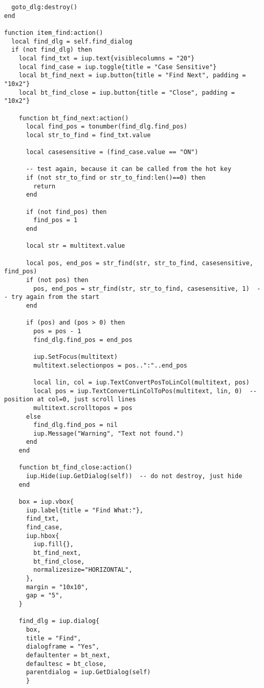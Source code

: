 \documentclass{ctexart}
\begin{document}
\begin{lstlisting}
  goto_dlg:destroy()
end

function item_find:action()
  local find_dlg = self.find_dialog
  if (not find_dlg) then
    local find_txt = iup.text{visiblecolumns = "20"}
    local find_case = iup.toggle{title = "Case Sensitive"}
    local bt_find_next = iup.button{title = "Find Next", padding = "10x2"}
    local bt_find_close = iup.button{title = "Close", padding = "10x2"}

    function bt_find_next:action()
      local find_pos = tonumber(find_dlg.find_pos)
      local str_to_find = find_txt.value

      local casesensitive = (find_case.value == "ON")

      -- test again, because it can be called from the hot key
      if (not str_to_find or str_to_find:len()==0) then
        return
      end

      if (not find_pos) then
        find_pos = 1
      end

      local str = multitext.value

      local pos, end_pos = str_find(str, str_to_find, casesensitive, find_pos)
      if (not pos) then
        pos, end_pos = str_find(str, str_to_find, casesensitive, 1)  -- try again from the start
      end

      if (pos) and (pos > 0) then
        pos = pos - 1
        find_dlg.find_pos = end_pos

        iup.SetFocus(multitext)
        multitext.selectionpos = pos..":"..end_pos

        local lin, col = iup.TextConvertPosToLinCol(multitext, pos)
        local pos = iup.TextConvertLinColToPos(multitext, lin, 0)  -- position at col=0, just scroll lines
        multitext.scrolltopos = pos
      else
        find_dlg.find_pos = nil
        iup.Message("Warning", "Text not found.")
      end
    end

    function bt_find_close:action()
      iup.Hide(iup.GetDialog(self))  -- do not destroy, just hide
    end

    box = iup.vbox{
      iup.label{title = "Find What:"},
      find_txt,
      find_case,
      iup.hbox{
        iup.fill{},
        bt_find_next,
        bt_find_close,
        normalizesize="HORIZONTAL", 
      },
      margin = "10x10", 
      gap = "5",
    }

    find_dlg = iup.dialog{
      box, 
      title = "Find", 
      dialogframe = "Yes", 
      defaultenter = bt_next, 
      defaultesc = bt_close,
      parentdialog = iup.GetDialog(self)
      }


\end{lstlisting}
\end{document}
